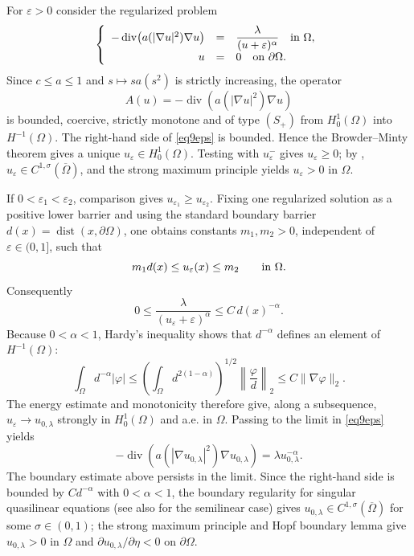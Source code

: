 \documentclass[11pt,leqno]{amsart}
\makeatletter
\renewenvironment{proof}[1][\proofname]{%
  \par
  \pushQED{\qed}%
  \normalfont
  \topsep6\p@\@plus6\p@\relax
  \trivlist
  \item[\hskip\labelsep\itshape #1\@addpunct{.}]%
  \hspace{0.5em}\ignorespaces
}{%
  \popQED
  \endtrivlist\@endpefalse
}
\makeatother
\begin{document}
\begin{proof}
For $\varepsilon>0$ consider the regularized problem
\begin{equation}\label{eq9eps}
\left\{
\begin{array}{rcl}
-\operatorname{div}\!\left(a(|\nabla u|^2)\nabla u\right)
&=&\displaystyle\frac{\lambda}{(u+\varepsilon)^\alpha}
\quad\hbox{in }\Omega,\\
u&=&0\quad\hbox{on }\partial\Omega .
\end{array}\right.
\end{equation}
Since $c\le a\le1$ and $s\mapsto s a(s^2)$ is strictly increasing, the
operator
\[
A(u)=-\operatorname{div}\!\left(a(|\nabla u|^2)\nabla u\right)
\]
is bounded, coercive, strictly monotone and of type $(S_+)$ from
$H_0^1(\Omega)$ into $H^{-1}(\Omega)$. The right-hand side of
\eqref{eq9eps} is bounded. Hence the Browder--Minty theorem gives a unique
$u_\varepsilon\in H_0^1(\Omega)$. Testing with $u_\varepsilon^-$ gives
$u_\varepsilon\ge0$; by \cite{Lie}, $u_\varepsilon\in C^{1,\sigma}(\overline\Omega)$,
and the strong maximum principle \cite{Mont.} yields
$u_\varepsilon>0$ in $\Omega$.

If $0<\varepsilon_1<\varepsilon_2$, comparison gives
$u_{\varepsilon_1}\ge u_{\varepsilon_2}$. Fixing one regularized solution
as a positive lower barrier and using the standard boundary barrier
$d(x)=\operatorname{dist}(x,\partial\Omega)$, one obtains constants
$m_1,m_2>0$, independent of $\varepsilon\in(0,1]$, such that
\[
 m_1d(x)\le u_\varepsilon(x)\le m_2
 \qquad\hbox{in }\Omega.
\]
Consequently
\[
0\le \frac{\lambda}{(u_\varepsilon+\varepsilon)^\alpha}
\le C\,d(x)^{-\alpha}.
\]
Because $0<\alpha<1$, Hardy's inequality shows that
$d^{-\alpha}$ defines an element of $H^{-1}(\Omega)$:
\[
\int_\Omega d^{-\alpha}|\varphi|
\le
\left(\int_\Omega d^{2(1-\alpha)}\right)^{1/2}
\left\|\frac{\varphi}{d}\right\|_2
\le C\|\nabla\varphi\|_2 .
\]
The energy estimate and monotonicity therefore give, along a subsequence,
$u_\varepsilon\to u_{0,\lambda}$ strongly in $H_0^1(\Omega)$ and a.e. in
$\Omega$. Passing to the limit in \eqref{eq9eps} yields
\[
-\operatorname{div}\!\left(a(|\nabla u_{0,\lambda}|^2)
\nabla u_{0,\lambda}\right)=\lambda u_{0,\lambda}^{-\alpha}.
\]
The boundary estimate above persists in the limit. Since the right-hand
side is bounded by $Cd^{-\alpha}$ with $0<\alpha<1$, the boundary regularity
for singular quasilinear equations \cite[Theorem B.1]{GiacomoniSchindlerTakac}
(see also \cite{GuiLin,delPino} for the semilinear case) gives
$u_{0,\lambda}\in C^{1,\sigma}(\overline\Omega)$ for some
$\sigma\in(0,1)$; the strong maximum principle and Hopf boundary lemma \cite{Mont.} give
$u_{0,\lambda}>0$ in $\Omega$ and
$\partial u_{0,\lambda}/\partial\eta<0$ on $\partial\Omega$.
\end{proof}
\end{document}
